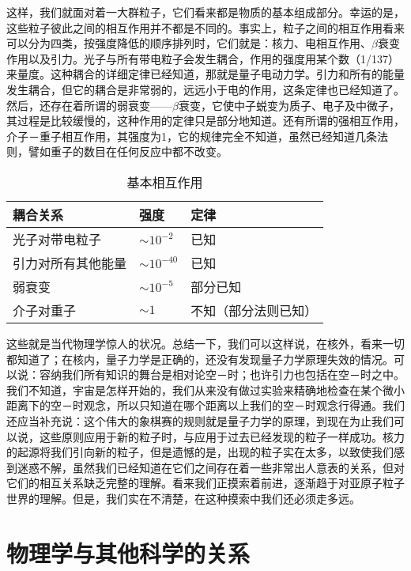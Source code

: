 \documentclass[12pt,oneside]{book}
\begin{document}
这样，我们就面对着一大群粒子，它们看来都是物质的基本组成部分。幸运的是，这些粒子彼此之间的相互作用并不都是不同的。事实上，粒子之间的相互作用看来可以分为四类，按强度降低的顺序排列时，它们就是：核力、电相互作用、$\beta$衰变作用以及引力。光子与所有带电粒子会发生耦合，作用的强度用某个数（1/137）来量度。这种耦合的详细定律已经知道，那就是量子电动力学。引力和所有的能量发生耦合，但它的耦合是非常弱的，远远小于电的作用，这条定律也已经知道了。然后，还存在着所谓的弱衰变——$\beta$衰变，它使中子蜕变为质子、电子及中微子，其过程是比较缓慢的，这种作用的定律只是部分地知道。还有所谓的强相互作用，介子－重子相互作用，其强度为1，它的规律完全不知道，虽然已经知道几条法则，譬如重子的数目在任何反应中都不改变。
\begin{table}[H]
\centering
\label{tab:基本相互作用}
\caption{基本相互作用}
\medskip 
\begin{tabular}{@{}lll@{}}
\toprule
耦合关系      & 强度             & 定律         \\ \midrule
光子对带电粒子   & $\sim10^{-2}$  & 已知         \\
引力对所有其他能量 & $\sim10^{-40}$ & 已知         \\
弱衰变       & $\sim10^{-5}$  & 部分已知       \\
介子对重子     & $\sim1$        & 不知（部分法则已知） \\ \bottomrule
\end{tabular}
\end{table}

这些就是当代物理学惊人的状况。总结一下，我们可以这样说，在核外，看来一切都知道了；在核内，量子力学是正确的，还没有发现量子力学原理失效的情况。可以说：容纳我们所有知识的舞台是相对论空－时；也许引力也包括在空－时之中。我们不知道，宇宙是怎样开始的，我们从来没有做过实验来精确地检查在某个微小距离下的空－时观念，所以只知道在哪个距离以上我们的空－时观念行得通。我们还应当补充说：这个伟大的象棋赛的规则就是量子力学的原理，到现在为止我们可以说，这些原则应用于新的粒子时，与应用于过去已经发现的粒子一样成功。核力的起源将我们引向新的粒子，但是遗憾的是，出现的粒子实在太多，以致使我们感到迷惑不解，虽然我们已经知道在它们之间存在着一些非常出人意表的关系，但对它们的相互关系缺乏完整的理解。看来我们正摸索着前进，逐渐趋于对亚原子粒子世界的理解。但是，我们实在不清楚，在这种摸索中我们还必须走多远。


\chapter{物理学与其他科学的关系}
\end{document}
